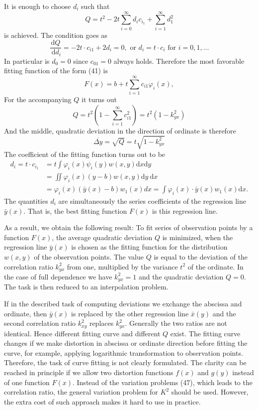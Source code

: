 \documentclass{article}
\begin{document}
It is enough to choose $d_i$ such that
\begin{equation}
    Q=t^{2}-2 t \sum_{i=0}^{\infty} d_{i} c_{i_{1}}+\sum_{i=1}^{\infty} d_{1}^{2}\tag{41a}
\end{equation}
is achieved. The condition goes as
$$
\frac{\mathrm{d} Q}{\mathrm{~d} d_{i}}=-2 t \cdot c_{i1}+2 d_{i}=0, \text { or } d_{i}=t \cdot c_{i} \text{ for } i=0,1,\dots
$$
In particular is $d_0=0$ since $c_{01}=0$ always holds.
Therefore the most favorable fitting function of the form (41) is
$$
F(x)=b+t \sum_{i=1}^{\infty} c_{i 1} \varphi_{i}(x),
$$
For the accompanying $Q$ it turns out
\begin{equation}
    Q=t^{2}\left(1-\sum_{i=1}^{\infty} c_{i 1}^{2}\right)=t^{2}\left(1-k_{y x}^{2} \right)
\end{equation}
And the middle, quadratic deviation in the direction of ordinate is therefore
\begin{equation}
\overline{\Delta y}=\sqrt{Q}=t \sqrt{1-k_{y x}^{2}}
\end{equation}
The coefficient of the fitting function turns out to be
\begin{align*}
d_{i}=t \cdot c_{i_{1}} &=t  \int \varphi_{i}(x) \psi_{i}(y) w(x, y) \mathrm{d} x \mathrm{d} y \\
&=\iint \varphi_{i}(x)(y-b) w(x, y) \mathrm{d} y \mathrm{~d} x \\
&= \varphi_{i}(x)(\bar{y}(x)-b) w_{1}(x) d x=\int \varphi_{i}(x) \cdot \bar{y}(x) w_{1}(x) \mathrm{d} x.
\end{align*}
The quantities $d_i$ are simultaneously the series coefficients of the regression line $\bar{y}(x)$.
That is, the best fitting function $F(x)$ is this regression line.

As a result, we obtain the following result: To fit series of observation points
by a function $F(x)$,  the average quadratic deviation $Q$ is minimized, when the regression line $\bar{y}(x)$ is chosen as the fitting function for the distribution $w(x,y)$ of the observation points. The value $Q$ is equal to the deviation of the correlation ratio
$k^2_{yx}$ from one, multiplied by the variance $t^2$ of the ordinate.
In the case of full dependence we have $k^2_{yx}=1$ and the quadratic deviation $Q=0$.
The task is then reduced to an interpolation problem.

If in the described task of computing deviations we exchange the abscissa
and ordinate, then $\bar{y}(x)$ is replaced by the other regression line $\bar{x}(y)$
and the second correlation ratio $k^2_{xy}$ replaces $k^2_{yx}$. Generally the two ratios
are not identical. Hence different fitting curve and different $Q$
exist. The fitting curve changes if we make distortion in abscissa or ordinate
direction before fitting the curve, for example, applying logarithmic transformation to observation points. Therefore, the task of curve
fitting is not clearly formulated. The clarity can be reached in principle
if we allow two distortion functions $f(x)$ and $g(y)$ instead
of one function $F(x)$. Instead of the variation problems (47), which leads to the correlation ratio, the general variation problem for $K^2$ should be used. However, the extra cost of such approach makes it hard to 
use in practice.
\end{document}
